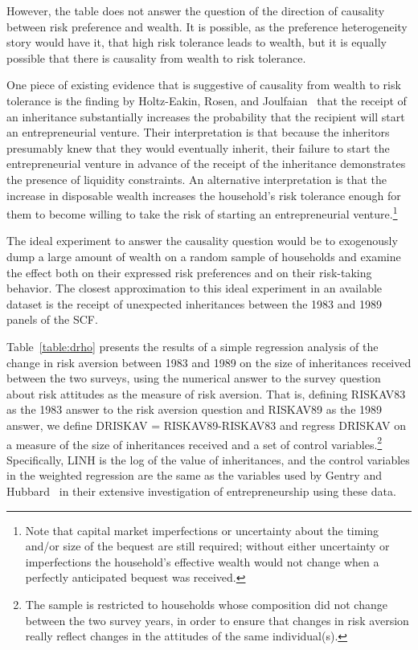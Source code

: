 \documentclass[12pt]{article}
\begin{document}
{\normalsize However, the table does not answer the question of the
direction of causality between risk preference and wealth. It is possible,
as the preference heterogeneity story would have it, that high risk
tolerance leads to wealth, but it is equally possible that there is
causality from wealth to risk tolerance. }

{\normalsize One piece of existing evidence that is suggestive of causality
from wealth to risk tolerance is the finding by Holtz-Eakin, Rosen, and
Joulfaian~\cite{hrj:entrep} that the receipt of an inheritance substantially
increases the probability that the recipient will start an entrepreneurial
venture. Their interpretation is that because the inheritors presumably knew
that they would eventually inherit, their failure to start the
entrepreneurial venture in advance of the receipt of the inheritance
demonstrates the presence of liquidity constraints. An alternative
interpretation is that the increase in disposable wealth increases the
household's risk tolerance enough for them to become willing to take the
risk of starting an entrepreneurial venture.\footnote{{\normalsize Note that
capital market imperfections or uncertainty about the timing and/or size of
the bequest are still required; without either uncertainty or imperfections
the household's effective wealth would not change when a perfectly
anticipated bequest was received.}} }

{\normalsize The ideal experiment to answer the causality question would be
to exogenously dump a large amount of wealth on a random sample of
households and examine the effect both on their expressed risk preferences
and on their risk-taking behavior. The closest approximation to this ideal
experiment in an available dataset is the receipt of unexpected inheritances
between the 1983 and 1989 panels of the SCF. }

{\normalsize Table~\ref{table:drho} presents the results of a simple
regression analysis of the change in risk aversion between 1983 and 1989 on
the size of inheritances received between the two surveys, using the
numerical answer to the survey question about risk attitudes as the measure
of risk aversion. That is, defining RISKAV83 as the 1983 answer to the risk
aversion question and RISKAV89 as the 1989 answer, we define DRISKAV =
RISKAV89-RISKAV83 and regress DRISKAV on a measure of the size of
inheritances received and a set of control variables.\footnote{{\normalsize %
The sample is restricted to households whose composition did not change
between the two survey years, in order to ensure that changes in risk
aversion really reflect changes in the attitudes of the same individual(s).}}
Specifically, LINH is the log of the value of inheritances, and the control
variables in the weighted regression are the same as the variables used by
Gentry and Hubbard~\cite{gentry&hubbard:wealthysave} in their extensive
investigation of entrepreneurship using these data. }
\end{document}
